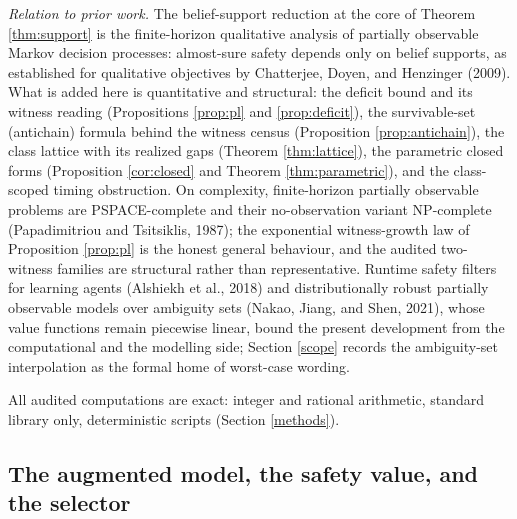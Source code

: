 \documentclass[10pt,twocolumn]{article}
\theoremstyle{plain}
\theoremstyle{definition}
\theoremstyle{remark}
\begin{document}
\emph{Relation to prior work.} The belief-support reduction at the core
of Theorem \ref{thm:support} is the finite-horizon qualitative analysis
of partially observable Markov decision processes: almost-sure safety
depends only on belief supports, as established for qualitative
objectives by Chatterjee, Doyen, and Henzinger (2009). What is added
here is quantitative and structural: the deficit bound and its witness
reading (Propositions \ref{prop:pl} and \ref{prop:deficit}), the
survivable-set (antichain) formula behind the witness census
(Proposition \ref{prop:antichain}), the class lattice with its realized
gaps (Theorem \ref{thm:lattice}), the parametric closed forms
(Proposition \ref{cor:closed} and Theorem \ref{thm:parametric}), and the
class-scoped timing obstruction. On complexity, finite-horizon partially
observable problems are PSPACE-complete and their no-observation variant
NP-complete (Papadimitriou and Tsitsiklis, 1987); the exponential
witness-growth law of Proposition \ref{prop:pl} is the honest general
behaviour, and the audited two-witness families are structural rather
than representative. Runtime safety filters for learning agents
(Alshiekh et al., 2018) and distributionally robust partially observable
models over ambiguity sets (Nakao, Jiang, and Shen, 2021), whose value
functions remain piecewise linear, bound the present development from
the computational and the modelling side; Section \ref{scope} records
the ambiguity-set interpolation as the formal home of worst-case
wording.

All audited computations are exact: integer and rational arithmetic,
standard library only, deterministic scripts (Section \ref{methods}).

\subsection{The augmented model, the safety value, and the selector}\label{model}
\end{document}
